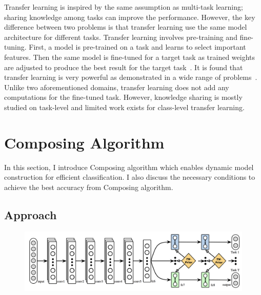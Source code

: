\documentclass{article}
\begin{document}
Transfer learning is inspired by the same assumption as multi-task learning; sharing knowledge among tasks can improve the performance. However, the key difference between two problems is that transfer learning use the same model architecture for different tasks. Transfer learning involves pre-training and fine-tuning. First, a model is pre-trained on a task and learns to select important features. Then the same model is fine-tuned for a target task as trained weights are adjusted to produce the best result for the target task~\cite{yosinski2014transferable}. It is found that transfer learning is very powerful as demonstrated in a wide range of problems~\cite{raina2007self, egan2004effects, glorot2011domain}. Unlike two aforementioned domains, transfer learning does not add any computations for the fine-tuned task. However, knowledge sharing is mostly studied on task-level and limited work exists for class-level transfer learning.

\section{Composing Algorithm}

In this section, I introduce Composing algorithm which enables dynamic model construction for efficient classification. I also discuss the necessary conditions to achieve the best accuracy from Composing algorithm.

\subsection{Approach}

\begin{figure}[t!]
  \centering
  \includegraphics[scale=0.25,trim={0mm 0mm 0mm 0mm},clip]{long2017learning.png}
\end{figure}
\end{document}
